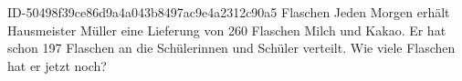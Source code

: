 \begin{exercise}
      {ID-50498f39ce86d9a4a043b8497ac9e4a2312c90a5}
      {Flaschen}
  \ifproblem\problem
    Jeden Morgen erhält Hausmeister Müller eine Lieferung von 260 Flaschen
    Milch und Kakao. Er hat schon 197 Flaschen an die Schülerinnen und Schüler
    verteilt. Wie viele Flaschen hat er jetzt noch?
  \fi
\end{exercise}
